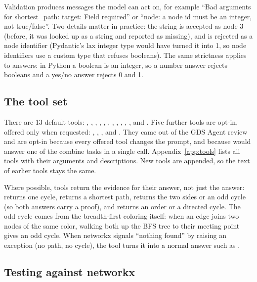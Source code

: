 Validation produces messages the model can act on, for example ``Bad arguments for shortest\_path: target: Field
required'' or ``node: a node id must be an integer, not true/false''. Two details matter in practice: the string
 is accepted as node 3 (before, it was looked up as a string and reported as missing), and  is
rejected as a node identifier (Pydantic's lax integer type would have turned it into 1, so node identifiers use a
custom type that refuses booleans). The same strictness applies to answers: in Python a boolean is an integer, so a
number answer rejects booleans and a yes/no answer rejects 0 and 1.

\subsection{The tool set}

There are 13 default tools: , , , ,
, , , , ,
, ,  and . Five further tools are
opt-in, offered only when requested: , , ,  and
. They came out of the GDS Agent review and are opt-in because every offered tool changes the
prompt, and because  would answer one of the combine tasks in a single call. Appendix~\ref{app:tools}
lists all tools with their arguments and descriptions. New tools are appended, so the text of earlier tools stays the
same.

Where possible, tools return the evidence for their answer, not just the answer:  returns one cycle,
 returns a shortest path,  returns the two sides or an odd cycle (so both answers
carry a proof), and  returns an order or a directed cycle. The odd cycle comes from the
breadth-first coloring itself: when an edge joins two nodes of the same color, walking both up the BFS tree to their
meeting point gives an odd cycle. When networkx signals ``nothing found'' by raising an exception (no path, no cycle),
the tool turns it into a normal answer such as .

\subsection{Testing against networkx}

